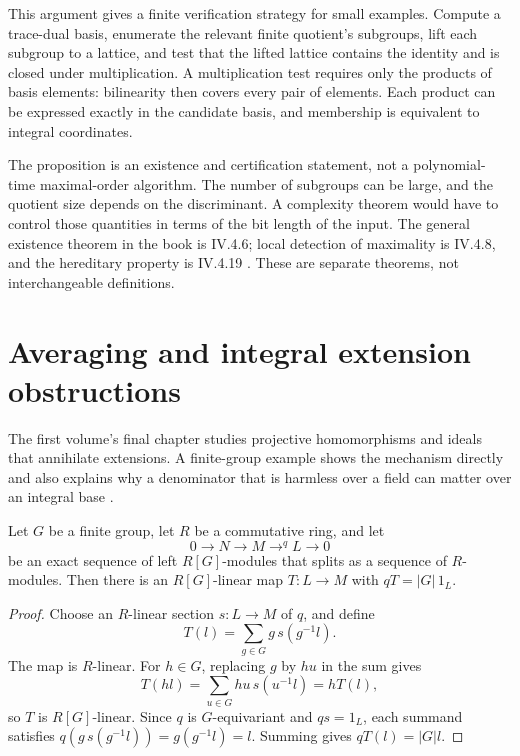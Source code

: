 This argument gives a finite verification strategy for small
examples. Compute a trace-dual basis, enumerate the relevant
finite quotient's subgroups, lift each subgroup to a lattice,
and test that the lifted lattice contains the identity and is
closed under multiplication. A multiplication test requires only
the products of basis elements: bilinearity then covers every
pair of elements. Each product can be expressed exactly in the
candidate basis, and membership is equivalent to integral
coordinates.

The proposition is an existence and certification statement,
not a polynomial-time maximal-order algorithm. The number of
subgroups can be large, and the quotient size depends on the
discriminant. A complexity theorem would have to control those
quantities in terms of the bit length of the input. The general
existence theorem in the book is IV.4.6; local detection of
maximality is IV.4.8, and the hereditary property is IV.4.19
\cite{RoggenkampHuberDyson1970}. These are separate theorems,
not interchangeable definitions.

\section{Averaging and integral extension obstructions}

The first volume's final chapter studies projective homomorphisms
and ideals that annihilate extensions. A finite-group example
shows the mechanism directly and also explains why a denominator
that is harmless over a field can matter over an integral base
\cite[Ch.~V]{RoggenkampHuberDyson1970}.

\begin{proposition}
Let $G$ be a finite group, let $R$ be a commutative ring, and
let
\[
 0\longrightarrow N\longrightarrow M
   \mathop{\longrightarrow}^{q} L\longrightarrow0
\]
be an exact sequence of left $R[G]$-modules that splits as a
sequence of $R$-modules. Then there is an $R[G]$-linear map
$T:L\to M$ with $qT=|G|\,1_L$.
\end{proposition}

\begin{proof}
Choose an $R$-linear section $s:L\to M$ of $q$, and define
\[
 T(l)=\sum_{g\in G}g\,s(g^{-1}l).
\]
The map is $R$-linear. For $h\in G$, replacing $g$ by $hu$
in the sum gives
\[
 T(hl)=\sum_{u\in G}hu\,s(u^{-1}l)=hT(l),
\]
so $T$ is $R[G]$-linear. Since $q$ is $G$-equivariant and
$qs=1_L$, each summand satisfies
$q(g\,s(g^{-1}l))=g(g^{-1}l)=l$. Summing gives
$qT(l)=|G|l$.
\end{proof}

